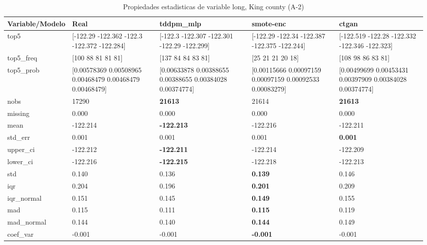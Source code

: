 \begin{table}[H]
\centering
\fontsize{8}{14}\selectfont
\caption{Propiedades  estadisticas de variable long, King county (A-2)}
\label{table-stats-king county-a-2-long}
\begin{tabular}{|l|m{10em}|m{10em}|m{10em}|m{10em}|}
\hline
 \rowcolor[gray]{0.8}
Variable/Modelo & Real & tddpm\_mlp & smote-enc & ctgan \\
\hline top5 & [-122.29  -122.362 -122.3   -122.372 -122.284] & [-122.3   -122.307 -122.301 -122.29  -122.299] & [-122.29  -122.34  -122.387 -122.375 -122.244] & [-122.519 -122.28  -122.332 -122.346 -122.323] \\
\hline top5\_freq & [100  88  81  81  81] & [137  84  84  83  81] & [25 21 21 20 18] & [108  98  86  83  81] \\
\hline top5\_prob & [0.00578369 0.00508965 0.00468479 0.00468479 0.00468479] & [0.00633878 0.00388655 0.00388655 0.00384028 0.00374774] & [0.00115666 0.00097159 0.00097159 0.00092533 0.00083279] & [0.00499699 0.00453431 0.00397909 0.00384028 0.00374774] \\
\hline nobs & 17290 & \bfseries 21613 & \cellcolor[rgb]{0.9, 0.54, 0.52} 21614 & \bfseries 21613 \\
\hline missing & 0.000 & 0.000 & 0.000 & 0.000 \\
\hline mean & -122.214 & \bfseries -122.213 & -122.216 & \cellcolor[rgb]{0.9, 0.54, 0.52} -122.211 \\
\hline std\_err & 0.001 & \cellcolor[rgb]{0.9, 0.54, 0.52} 0.001 & 0.001 & \bfseries 0.001 \\
\hline upper\_ci & -122.212 & \bfseries -122.211 & -122.214 & \cellcolor[rgb]{0.9, 0.54, 0.52} -122.209 \\
\hline lower\_ci & -122.216 & \bfseries -122.215 & -122.218 & \cellcolor[rgb]{0.9, 0.54, 0.52} -122.213 \\
\hline std & 0.140 & 0.136 & \bfseries 0.139 & \cellcolor[rgb]{0.9, 0.54, 0.52} 0.146 \\
\hline iqr & 0.204 & \cellcolor[rgb]{0.9, 0.54, 0.52} 0.196 & \bfseries 0.201 & 0.209 \\
\hline iqr\_normal & 0.151 & \cellcolor[rgb]{0.9, 0.54, 0.52} 0.145 & \bfseries 0.149 & 0.155 \\
\hline mad & 0.115 & \cellcolor[rgb]{0.9, 0.54, 0.52} 0.111 & \bfseries 0.115 & 0.119 \\
\hline mad\_normal & 0.144 & \cellcolor[rgb]{0.9, 0.54, 0.52} 0.140 & \bfseries 0.144 & 0.149 \\
\hline coef\_var & -0.001 & -0.001 & \bfseries -0.001 & \cellcolor[rgb]{0.9, 0.54, 0.52} -0.001 \\

\end{tabular}
\end{table}
